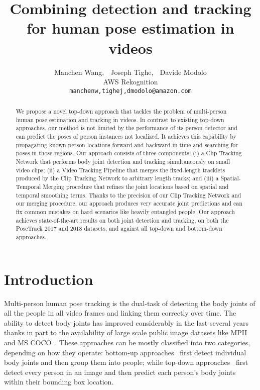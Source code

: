 \documentclass[10pt,twocolumn,letterpaper]{article}
\begin{document}
\title{Combining detection and tracking for human pose estimation in videos}


\author{Manchen Wang, $\;$ Joseph Tighe, $\;$ Davide Modolo\\ 
AWS Rekognition \\
{\tt\small manchenw,tighej,dmodolo@amazon.com}}

\maketitle
\thispagestyle{empty}


\begin{abstract}
We propose a novel top-down approach that tackles the problem of multi-person human pose estimation and tracking in videos. In contrast to existing top-down approaches, our method is not limited by the performance of its person detector and can predict the poses of person instances not localized. It achieves this capability by propagating known person locations forward and backward in time and searching for poses in those regions. Our approach consists of three components: (i) a Clip Tracking Network that performs body joint detection and tracking simultaneously on small video clips; (ii) a Video Tracking Pipeline that merges the fixed-length tracklets produced by the Clip Tracking Network to arbitrary length tracks; and (iii) a Spatial-Temporal Merging procedure that refines the joint locations based on spatial and temporal smoothing terms. Thanks to the precision of our Clip Tracking Network and our merging procedure, our approach produces very accurate joint predictions and can fix common mistakes on hard scenarios like heavily entangled people. Our approach achieves state-of-the-art results on both joint detection and tracking, on both the PoseTrack 2017 and 2018 datasets, and against all top-down and bottom-down approaches.
\end{abstract}


\vspace{-4mm}
\section{Introduction}

Multi-person human pose tracking is the dual-task of detecting the body joints of all the people in all video frames and linking them correctly over time. 
The ability to detect body joints has improved considerably in the last several years~\cite{andriluka14cvpr,pishchulin16cvpr,wei16cvpr,newell16eccv,insafutdinov16eccv,newell2017associative,cao2018openpose,chen2018cascaded, he2017mask, sun2019deep} thanks in part to the availability of large scale public image datasets like MPII~\cite{andriluka14cvpr} and MS COCO~\cite{lin2014microsoft}. 
These approaches can be mostly classified into two categories, depending on how they operate: bottom-up approaches~\cite{andriluka14cvpr, wei16cvpr, cao2018openpose, insafutdinov16eccv, newell2017associative, pishchulin16cvpr} first detect individual body joints and then group them into people; while top-down approaches~\cite{chen2018cascaded, he2017mask, sun2019deep} first detect every person in an image and then predict each person's body joints within their bounding box location. 
\end{document}
